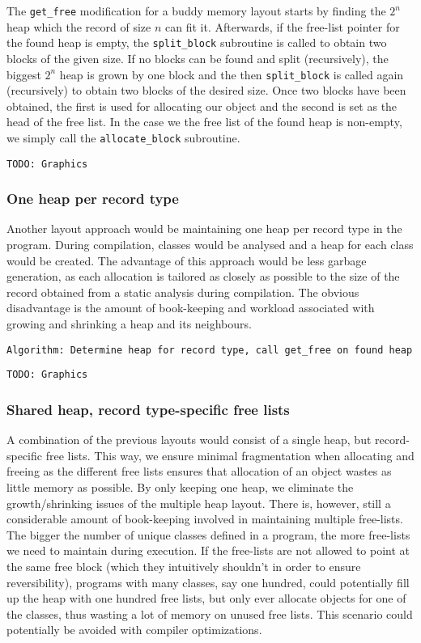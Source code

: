 The \texttt{get\_free} modification for a buddy memory layout starts by finding the $2^n$ heap which the record of size $n$ can fit it. Afterwards, if the free-list pointer for the found heap is empty, the \texttt{split\_block} subroutine is called to obtain two blocks of the given size. If no blocks can be found and split (recursively), the biggest $2^n$ heap is grown by one block and the then \texttt{split\_block} is called again (recursively) to obtain two blocks of the desired size. Once two blocks have been obtained, the first is used for allocating our object and the second is set as the head of the free list. In the case we the free list of the found heap is non-empty, we simply call the \texttt{allocate\_block} subroutine.

\texttt{TODO: Graphics}

\subsubsection{One heap per record type}
Another layout approach would be maintaining one heap per record type in the program. During compilation, classes would be analysed and a heap for each class would be created. The advantage of this approach would be less garbage generation, as each allocation is tailored as closely as possible to the size of the record obtained from a static analysis during compilation. The obvious disadvantage is the amount of book-keeping and workload associated with growing and shrinking a heap and its neighbours.

\texttt{Algorithm: Determine heap for record type, call get\_free on found heap}

\texttt{TODO: Graphics}

\subsubsection{Shared heap, record type-specific free lists}
A combination of the previous layouts would consist of a single heap, but record-specific free lists. This way, we ensure minimal fragmentation when allocating and freeing as the different free lists ensures that allocation of an object wastes as little memory as possible. By only keeping one heap, we eliminate the growth/shrinking issues of the multiple heap layout. There is, however, still a considerable amount of book-keeping involved in maintaining multiple free-lists. The bigger the number of unique classes defined in a program, the more free-lists we need to maintain during execution. If the free-lists are not allowed to point at the same free block (which they intuitively shouldn't in order to ensure reversibility), programs with many classes, say one hundred, could potentially fill up the heap with one hundred free lists, but only ever allocate objects for one of the classes, thus wasting a lot of memory on unused free lists. This scenario could potentially be avoided with compiler optimizations.


